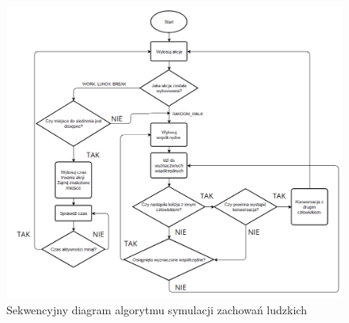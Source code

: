 \begin{figure}[h!]
	\includegraphics[width=\linewidth]{DiagramAlgorytmuZachowania.png}
	\caption{Sekwencyjny diagram algorytmu symulacji zachowań ludzkich}
	\label{diagramZachowanie}
\end{figure}




%     

%      


